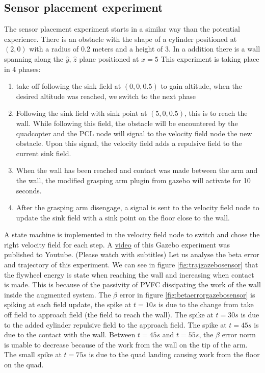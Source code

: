 \subsection{Sensor placement experiment}
The sensor placement experiment starts in a similar way than the potential experience. 
There is an obstacle with the shape of a cylinder positioned at $(2,0)$ with a radius of $0.2$ meters and a height of $3$.
In a addition there is a wall spanning along the $\hat{y}$, $\hat{z}$ plane positioned at $x=5$
This experiment is taking place in 4 phases:
\begin{enumerate}
   \item take off following the sink field at $(0,0,0.5)$ to gain altitude, when the desired altitude was reached, we switch to the next phase 
   \item Following the sink field with sink point at $(5,0,0.5)$, this is to reach the wall. While following this field, the obstacle will be encountered by the quadcopter and the PCL node will signal to the velocity field node the new obstacle. Upon this signal, the velocity field adds a repulsive field to the current sink field. 
   \item When the wall has been reached and contact was made between the arm and the wall, the modified grasping arm plugin from gazebo will activate for 10 seconds.
   \item After the grasping arm disengage, a signal is sent to the velocity field node to update the sink field with a sink point on the floor close to the wall.
\end{enumerate}
A state machine is implemented in the velocity field node to switch and chose the right velocity field for each step. 
A \href{https://www.youtube.com/watch?v=bR4PmFp38t0}{video} of this Gazebo experiment was published to Youtube. (Please watch with subtitles)
Let us analyse the beta error and trajectory of this experiment.
We can see in figure \ref{fig:trajgazebosensor} that the flywheel energy is state when reaching the wall and increasing when contact is made. This is because of the passivity of PVFC dissipating the work of the wall inside the augmented system.
The $\beta$ error in figure \ref{fig:betaerrorgazebosensor} is spiking at each field update, the spike at $t=10s$ is due to the change from take off field to approach field (the field to reach the wall). 
The spike at $t=30s$ is due to the added cylinder repulsive field to the approach field.
The spike at $t=45s$ is due to the contact with the wall. Between $t=45s$ and $t=55s$, the $\beta$ error norm is unable to decrease because of the work from the wall on the tip of the arm. 
The small spike at $t=75s$ is due to the quad landing causing work from the floor on the quad.

